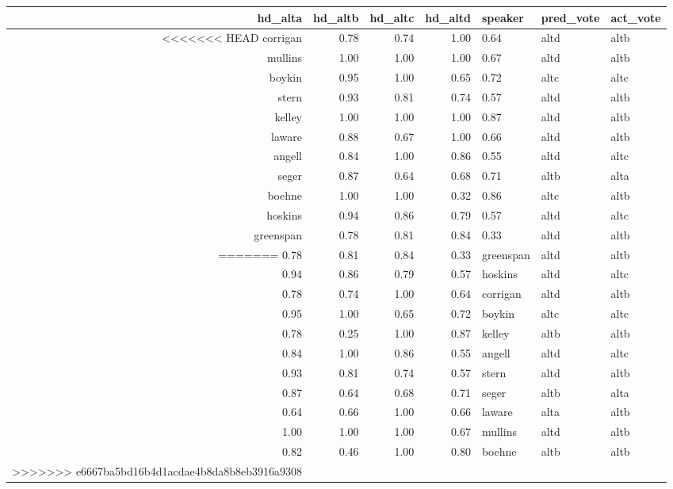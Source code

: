 \begin{tabular}{rrrrlll}
\toprule
 hd\_alta &  hd\_altb &  hd\_altc &  hd\_altd &    speaker & pred\_vote & act\_vote \\
\midrule
<<<<<<< HEAD
  corrigan &     0.78 &     0.74 &     1.00 &     0.64 &      altd &     altb \\
   mullins &     1.00 &     1.00 &     1.00 &     0.67 &      altd &     altb \\
    boykin &     0.95 &     1.00 &     0.65 &     0.72 &      altc &     altc \\
     stern &     0.93 &     0.81 &     0.74 &     0.57 &      altd &     altb \\
    kelley &     1.00 &     1.00 &     1.00 &     0.87 &      altd &     altb \\
    laware &     0.88 &     0.67 &     1.00 &     0.66 &      altd &     altb \\
    angell &     0.84 &     1.00 &     0.86 &     0.55 &      altd &     altc \\
     seger &     0.87 &     0.64 &     0.68 &     0.71 &      altb &     alta \\
    boehne &     1.00 &     1.00 &     0.32 &     0.86 &      altc &     altb \\
   hoskins &     0.94 &     0.86 &     0.79 &     0.57 &      altd &     altc \\
 greenspan &     0.78 &     0.81 &     0.84 &     0.33 &      altd &     altb \\
=======
    0.78 &     0.81 &     0.84 &     0.33 &  greenspan &      altd &     altb \\
    0.94 &     0.86 &     0.79 &     0.57 &    hoskins &      altd &     altc \\
    0.78 &     0.74 &     1.00 &     0.64 &   corrigan &      altd &     altb \\
    0.95 &     1.00 &     0.65 &     0.72 &     boykin &      altc &     altc \\
    0.78 &     0.25 &     1.00 &     0.87 &     kelley &      altb &     altb \\
    0.84 &     1.00 &     0.86 &     0.55 &     angell &      altd &     altc \\
    0.93 &     0.81 &     0.74 &     0.57 &      stern &      altd &     altb \\
    0.87 &     0.64 &     0.68 &     0.71 &      seger &      altb &     alta \\
    0.64 &     0.66 &     1.00 &     0.66 &     laware &      alta &     altb \\
    1.00 &     1.00 &     1.00 &     0.67 &    mullins &      altd &     altb \\
    0.82 &     0.46 &     1.00 &     0.80 &     boehne &      altb &     altb \\
>>>>>>> e6667ba5bd16b4d1acdae4b8da8b8eb3916a9308
\bottomrule
\end{tabular}
